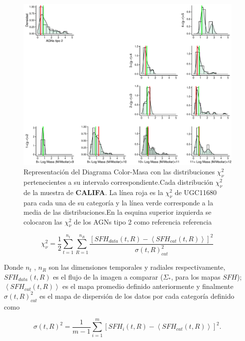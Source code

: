 \begin{figure}
  \centering
    \includegraphics[scale=0.5]{exp_chi_perl.pdf}
  \caption[Diagrama de distribuciones $\chi^{2}_{\nu}$ en Color-Masa ]{Representación del Diagrama Color-Masa  con las distribuciones $\chi^2_{\nu}$ pertenecientes a su intervalo correspondiente.Cada distribución $\chi^2_{\nu}$ de la muestra de  \textbf{CALIFA}. La línea roja es la $\chi^2_{\nu}$ de UGC11680 para cada una de su categoría y la línea verde corresponde a la media de las distribuciones.En la esquina superior izquierda se colocaron las $\chi^2_{\nu}$ de los AGNs tipo 2 como referencia referencia }
  \label{chi_todos_mean}
\end{figure}




\begin{equation}
\chi^{2}_{\nu} = \frac{1}{2} \sum_{t=1}^{n_t} \sum_{R=1}^{n_R}  \frac{ \left[SFH_{data}(t,R)- \left <SFH_{cat}(t,R) \right > \right]^2}{\sigma(t,R)_{cat}^2}
\end{equation}

\bigskip

\noindent Donde $n_t$ , $n_R$ son las dimensiones temporales y radiales respectivamente, $SFH_{data}(t,R)$ es el flujo de la imagen a comparar ($\Sigma_{*}$, para los mapas $SFH$); $\left <SFH_{cat}(t,R)\right >$ es el mapa promedio definido anteriormente y finalmente  $\sigma(t,R)_{cat}^2$ es el mapa de dispersión de los datos por cada categoría definido como

\begin{equation}
\sigma(t,R)^2= \frac{1}{m-1} \sum_{i=1}^{m} \left[SFH_{i}(t,R)- \left <SFH_{cat}(t,R) \right > \right]^2.
\end{equation}


